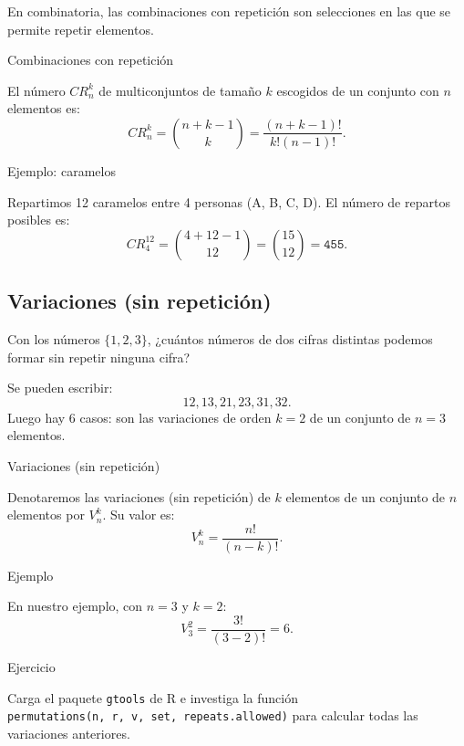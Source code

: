 \documentclass[
  letterpaper,
  DIV=11,
  numbers=noendperiod]{scrreprt}
\begin{document}
En combinatoria, las combinaciones con repetición son selecciones en las
que se permite repetir elementos.

\begin{Definicion}{Combinaciones con repetición}{}

El número \(CR_n^k\) de multiconjuntos de tamaño \(k\) escogidos de un
conjunto con \(n\) elementos es: \[
CR_n^k = \binom{n+k-1}{k} = \frac{(n+k-1)!}{k!(n-1)!}.
\]

\end{Definicion}

\begin{Ejemplo}{Ejemplo: caramelos}{}

Repartimos 12 caramelos entre 4 personas (A, B, C, D). El número de
repartos posibles es: \[
CR_4^{12} = \binom{4+12-1}{12}=\binom{15}{12}=\texttt{455}.
\]

\end{Ejemplo}

\subsection{Variaciones (sin
repetición)}\label{variaciones-sin-repeticiuxf3n}

Con los números \(\{1,2,3\}\), ¿cuántos números de dos cifras distintas
podemos formar sin repetir ninguna cifra?

Se pueden escribir: \[
12,13,21,23,31,32.
\] Luego hay 6 casos: son las variaciones de orden \(k=2\) de un
conjunto de \(n=3\) elementos.

\begin{Definicion}{Variaciones (sin repetición)}{}

Denotaremos las variaciones (sin repetición) de \(k\) elementos de un
conjunto de \(n\) elementos por \(V_n^k\). Su valor es: \[
V_n^k=\frac{n!}{(n-k)!}.
\]

\end{Definicion}

\begin{Ejemplo}{Ejemplo}{}

En nuestro ejemplo, con \(n=3\) y \(k=2\): \[
V_3^2=\frac{3!}{(3-2)!}=6.
\]

\end{Ejemplo}

\begin{Definicion}{Ejercicio}{}

Carga el paquete \texttt{gtools} de R e investiga la función
\texttt{permutations(n,\ r,\ v,\ set,\ repeats.allowed)} para calcular
todas las variaciones anteriores.

\end{Definicion}
\end{document}

